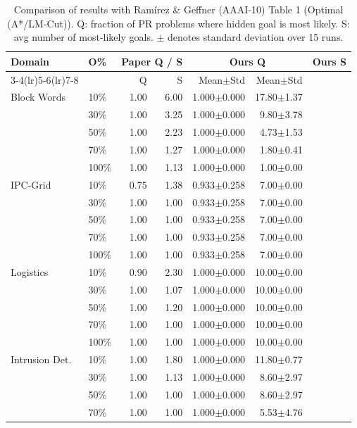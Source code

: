 \begin{table}[t]
\centering
\caption{Comparison of results with Ramírez \& Geffner (AAAI-10) Table 1 (Optimal (A*/LM-Cut)). Q: fraction of PR problems where hidden goal is most likely. S: avg number of most-likely goals. $\pm$ denotes standard deviation over 15 runs.}
\label{tab:results_optimal}
\small
\begin{tabular}{llrrrrrr}
\toprule
Domain & O\% & \multicolumn{2}{c}{Paper Q / S} & \multicolumn{2}{c}{Ours Q} & \multicolumn{2}{c}{Ours S} \\
\cmidrule(lr){3-4}\cmidrule(lr){5-6}\cmidrule(lr){7-8}
 & & Q & S & Mean$\pm$Std & Mean$\pm$Std \\
\midrule
Block Words & 10\% & 1.00 & 6.00 & 1.000$\pm$0.000 & 17.80$\pm$1.37 \\
 & 30\% & 1.00 & 3.25 & 1.000$\pm$0.000 & 9.80$\pm$3.78 \\
 & 50\% & 1.00 & 2.23 & 1.000$\pm$0.000 & 4.73$\pm$1.53 \\
 & 70\% & 1.00 & 1.27 & 1.000$\pm$0.000 & 1.80$\pm$0.41 \\
 & 100\% & 1.00 & 1.13 & 1.000$\pm$0.000 & 1.00$\pm$0.00 \\
\midrule
IPC-Grid & 10\% & 0.75 & 1.38 & 0.933$\pm$0.258 & 7.00$\pm$0.00 \\
 & 30\% & 1.00 & 1.00 & 0.933$\pm$0.258 & 7.00$\pm$0.00 \\
 & 50\% & 1.00 & 1.00 & 0.933$\pm$0.258 & 7.00$\pm$0.00 \\
 & 70\% & 1.00 & 1.00 & 0.933$\pm$0.258 & 7.00$\pm$0.00 \\
 & 100\% & 1.00 & 1.00 & 0.933$\pm$0.258 & 7.00$\pm$0.00 \\
\midrule
Logistics & 10\% & 0.90 & 2.30 & 1.000$\pm$0.000 & 10.00$\pm$0.00 \\
 & 30\% & 1.00 & 1.07 & 1.000$\pm$0.000 & 10.00$\pm$0.00 \\
 & 50\% & 1.00 & 1.20 & 1.000$\pm$0.000 & 10.00$\pm$0.00 \\
 & 70\% & 1.00 & 1.00 & 1.000$\pm$0.000 & 10.00$\pm$0.00 \\
 & 100\% & 1.00 & 1.00 & 1.000$\pm$0.000 & 10.00$\pm$0.00 \\
\midrule
Intrusion Det. & 10\% & 1.00 & 1.80 & 1.000$\pm$0.000 & 11.80$\pm$0.77 \\
 & 30\% & 1.00 & 1.13 & 1.000$\pm$0.000 & 8.60$\pm$2.97 \\
 & 50\% & 1.00 & 1.00 & 1.000$\pm$0.000 & 8.60$\pm$2.97 \\
 & 70\% & 1.00 & 1.00 & 1.000$\pm$0.000 & 5.53$\pm$4.76 \\

\end{tabular}
\end{table}
